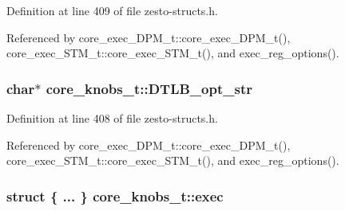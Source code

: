 Definition at line 409 of file zesto-structs.h.

Referenced by core\_\-exec\_\-DPM\_\-t::core\_\-exec\_\-DPM\_\-t(), core\_\-exec\_\-STM\_\-t::core\_\-exec\_\-STM\_\-t(), and exec\_\-reg\_\-options().
\subsubsection[{DTLB\_\-opt\_\-str}]{\setlength{\rightskip}{0pt plus 5cm}char$\ast$ {\bf core\_\-knobs\_\-t::DTLB\_\-opt\_\-str}}\label{structcore__knobs__t_3c4cb1fda100504efeec7a6559ccad90}




Definition at line 408 of file zesto-structs.h.

Referenced by core\_\-exec\_\-DPM\_\-t::core\_\-exec\_\-DPM\_\-t(), core\_\-exec\_\-STM\_\-t::core\_\-exec\_\-STM\_\-t(), and exec\_\-reg\_\-options().
\subsubsection[{exec}]{\setlength{\rightskip}{0pt plus 5cm}struct \{ ... \}   {\bf core\_\-knobs\_\-t::exec}}\label{structcore__knobs__t_850a6f528cfc66eb1a963269d39d19fc}




